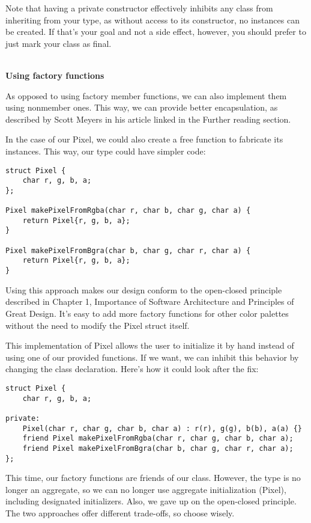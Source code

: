 Note that having a private constructor effectively inhibits any class from inheriting from your type, as without access to its constructor, no instances can be created. If that's your goal and not a side effect, however, you should prefer to just mark your class as final.

\hspace*{\fill} \\ %
\noindent
\textbf{Using factory functions}

As opposed to using factory member functions, we can also implement them using nonmember ones. This way, we can provide better encapsulation, as described by Scott Meyers in his article linked in the Further reading section.

In the case of our Pixel, we could also create a free function to fabricate its instances. This way, our type could have simpler code:

\begin{lstlisting}[style=styleCXX]
struct Pixel {
	char r, g, b, a;
};

Pixel makePixelFromRgba(char r, char b, char g, char a) {
	return Pixel{r, g, b, a};
}

Pixel makePixelFromBgra(char b, char g, char r, char a) {
	return Pixel{r, g, b, a};
}
\end{lstlisting}

Using this approach makes our design conform to the open-closed principle described in Chapter 1, Importance of Software Architecture and Principles of Great Design. It's easy to add more factory functions for other color palettes without the need to modify the Pixel struct itself.

This implementation of Pixel allows the user to initialize it by hand instead of using one of our provided functions. If we want, we can inhibit this behavior by changing the class declaration. Here's how it could look after the fix:

\begin{lstlisting}[style=styleCXX]
struct Pixel {
	char r, g, b, a;
	
private:
	Pixel(char r, char g, char b, char a) : r(r), g(g), b(b), a(a) {}
	friend Pixel makePixelFromRgba(char r, char g, char b, char a);
	friend Pixel makePixelFromBgra(char b, char g, char r, char a);
};
\end{lstlisting}

This time, our factory functions are friends of our class. However, the type is no longer an aggregate, so we can no longer use aggregate initialization (Pixel{}), including designated initializers. Also, we gave up on the open-closed principle. The two approaches offer different trade-offs, so choose wisely.

